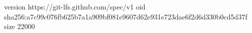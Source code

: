 version https://git-lfs.github.com/spec/v1
oid sha256:a7c99c076fb625b7a1a909bf081e9607d62e931e723dae6f2d6d330b0cd5d37f
size 22000
